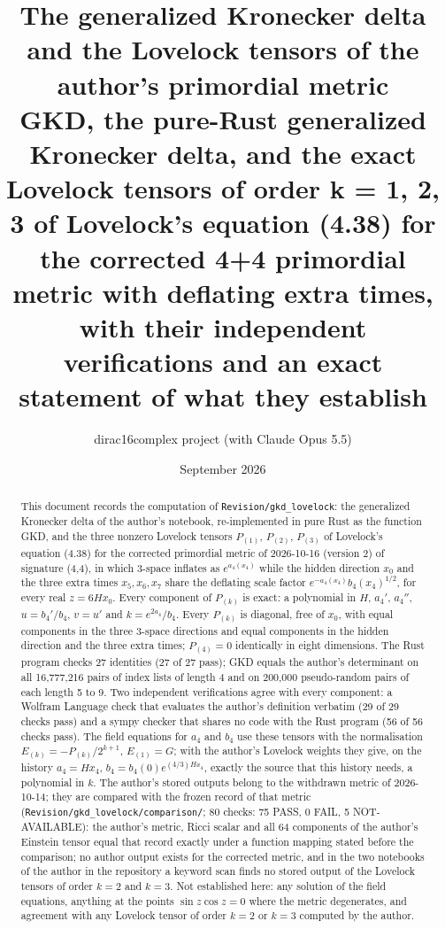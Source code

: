 \documentclass[11pt]{article}
\title{The generalized Kronecker delta and the Lovelock tensors of the author's primordial metric\\[0.5em]\large GKD, the pure-Rust generalized Kronecker delta, and the exact Lovelock tensors of order k = 1, 2, 3 of Lovelock's equation (4.38) for the corrected 4+4 primordial metric with deflating extra times, with their independent verifications and an exact statement of what they establish}
\author{dirac16complex project (with Claude Opus 5.5)}
\date{September 2026}
\begin{document}
\maketitle
\tableofcontents
\newpage
\begin{abstract}
This document records the computation of \texttt{Revision\allowbreak{}/gkd\_lov\allowbreak{}elock}: the generalized Kronecker delta of the author's notebook, re-implemented in pure Rust as the function GKD, and the three nonzero Lovelock tensors $P_{(1)}$, $P_{(2)}$, $P_{(3)}$ of Lovelock's equation (4.38) for the corrected primordial metric of 2026-10-16 (version 2) of signature (4,4), in which 3-space inflates as $e^{a_4(x_4)}$ while the hidden direction $x_0$ and the three extra times $x_5, x_6, x_7$ share the deflating scale factor $e^{-a_4(x_4)}b_4(x_4)^{1/2}$, for every real $z = 6Hx_0$. Every component of $P_{(k)}$ is exact: a polynomial in $H$, $a_4'$, $a_4''$, $u = b_4'/b_4$, $v = u'$ and $k = e^{2a_4}/b_4$. Every $P_{(k)}$ is diagonal, free of $x_0$, with equal components in the three 3-space directions and equal components in the hidden direction and the three extra times; $P_{(4)} = 0$ identically in eight dimensions. The Rust program checks 27 identities (27 of 27 pass); GKD equals the author's determinant on all 16,777,216 pairs of index lists of length 4 and on 200,000 pseudo-random pairs of each length 5 to 9. Two independent verifications agree with every component: a Wolfram Language check that evaluates the author's definition verbatim (29 of 29 checks pass) and a sympy checker that shares no code with the Rust program (56 of 56 checks pass). The field equations for $a_4$ and $b_4$ use these tensors with the normalisation $E_{(k)} = -P_{(k)}/2^{k+1}$, $E_{(1)} = G$; with the author's Lovelock weights they give, on the history $a_4 = Hx_4$, $b_4 = b_4(0)e^{(4/3)Hx_4}$, exactly the source that this history needs, a polynomial in $k$. The author's stored outputs belong to the withdrawn metric of 2026-10-14; they are compared with the frozen record of that metric (\texttt{Revision\allowbreak{}/gkd\_lov\allowbreak{}elock/co\allowbreak{}mparison\allowbreak{}/}; 80 checks: 75 PASS, 0 FAIL, 5 NOT-AVAILABLE): the author's metric, Ricci scalar and all 64 components of the author's Einstein tensor equal that record exactly under a function mapping stated before the comparison; no author output exists for the corrected metric, and in the two notebooks of the author in the repository a keyword scan finds no stored output of the Lovelock tensors of order $k = 2$ and $k = 3$. Not established here: any solution of the field equations, anything at the points $\sin z\cos z = 0$ where the metric degenerates, and agreement with any Lovelock tensor of order $k = 2$ or $k = 3$ computed by the author.

\end{abstract}
\end{document}
